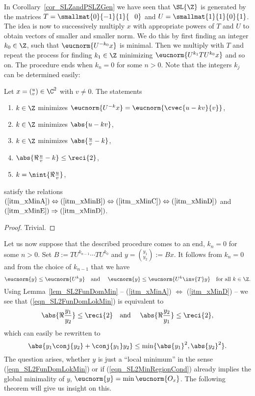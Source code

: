 In Corollary~\ref{cor_SLZandPSLZGen} we have seen that $\SL{\Z}$ is generated by the matrices $T = \smallmat{0}{-1}{1}{\phantom{-}0}$ and $U = \smallmat{1}{1}{0}{1}$. The idea is now to successively multiply $x$ with appropriate powers of $T$ and $U$ to obtain vectors of smaller and smaller norm. We do this by first finding an integer $k_0 \in \Z$, such that $\eucnorm{U^{-k_0}x}$ is minimal. Then we multiply with $T$ and repeat the process for finding $k_1 \in \Z$ minimizing $\eucnorm{U^{k_1} T U^{k_0} x}$ and so on. The procedure ends when $k_n = 0$ for some $n>0$. Note that the integers $k_j$ can be determined easily:
\begin{lemma}
\label{lem_SL2FunDomMin}
Let $x = ({}^u_v)\in \C^2$ with $v \ne 0$. The statements
\begin{enumerate}[\qquad(i)]
\item \label{itm_xMinA}
$k \in \Z$ minimizes $\eucnorm{U^{-k}x} = \eucnorm{\cvec{u - k v}{v}}$,
\item \label{itm_xMinB} $k \in \Z$ minimizes $\abs{u - k v}$,
\item \label{itm_xMinC} $k \in \Z$ minimizes $\abs{\frac{u}{v} - k}$,
\item \label{itm_xMinD} $\abs{\Re{\frac{u}{v}} - k} \le \reci{2}$,
\item \label{itm_xMinE} $k = \nint{\Re{\frac{u}{v}}}$,
\end{enumerate}
satisfy the relations $(\ref{itm_xMinA}) \Leftrightarrow (\ref{itm_xMinB}) \Leftrightarrow (\ref{itm_xMinC}) \Leftrightarrow (\ref{itm_xMinD})$ and $(\ref{itm_xMinE}) \Rightarrow (\ref{itm_xMinD})$.
\end{lemma}
\begin{proof}
Trivial.
\end{proof}
Let us now suppose that the described procedure comes to an end, \ie $k_n = 0$ for some $n > 0$. Set $B  := TU^{k_{n-1}} \cdots TU^{k_0}$ and $y = ({}^{y_1}_{y_2}) :=  Bx$. It follows from $k_n = 0$ and from the choice of $k_{n-1}$ that we have 
\begin{equation}
\label{eqn_SL2FunDomLokMin}
\eucnorm{y} \le \eucnorm{U^k y} \text{\quad and \quad} \eucnorm{y} \le \eucnorm{U^k \inv{T} y} \text{\quad for all } k \in \Z.
\end{equation}
Using Lemma~\ref{lem_SL2FunDomMin} -- (\ref{itm_xMinA}) $\Leftrightarrow$ (\ref{itm_xMinD}) -- we see that (\ref{eqn_SL2FunDomLokMin}) is equivalent to
\begin{equation*}
\abs{\Re{\frac{y_1}{y_2}}} \le \reci{2} \text{\quad and \quad} \abs{\Re{\frac{y_2}{y_1}}} \le \reci{2},
\end{equation*}
which can easily be rewritten to
\begin{equation}
\label{eqn_SL2MinRegionCond}
\abs{y_1 \conj{y_2} + \conj{y_1} y_2} \le \min\{\abs{y_1}^2, \abs{y_2}^2\}.
\end{equation}
The question arises, whether $y$ is just a ``local minimum'' in the sense (\ref{eqn_SL2FunDomLokMin}) or if (\ref{eqn_SL2MinRegionCond}) already implies the global minimality of $y$, \ie $\eucnorm{y} = \min \eucnorm{O_x}$. The following theorem will give us insight on this.

